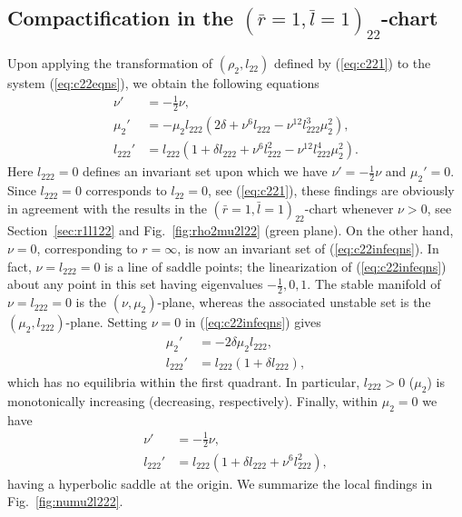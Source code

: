 \documentclass[reqno,12pt]{amsart}
\newcommand{\secref}[1]{Section~\ref{sec:#1}}
\newcommand{\seclab}[1]{\label{sec:#1}}
\newcommand{\eqlab}[1]{\label{eq:#1}}
\renewcommand{\eqref}[1]{(\ref{eq:#1})}
\newcommand{\figref}[1]{Fig.~\ref{fig:#1}}
\numberwithin{equation}{section}
\begin{document}
\subsection{Compactification in the $(\bar r=1,\bar l=1)_{22}$-chart}\seclab{inf2}
Upon applying the transformation of $(\rho_2,l_{22})$ defined by \eqref{c221} to the system \eqref{c22eqns}, we obtain the following equations
\begin{equation}\eqlab{c22infeqns}
\begin{aligned}
  \nu' &= - \frac12 \nu,\\
  \mu_{2}' &= -\mu_2 l_{222}\left(2\delta+\nu^6 l_{222}-\nu^{12} l_{222}^3 \mu_2^2\right),\\
 l_{222}' &=l_{222}\left(1+\delta l_{222}+\nu^6 l_{222}^2-\nu^{12} l_{222}^4 \mu_2^2\right).
\end{aligned}
\end{equation}
Here $l_{222}=0$ defines an invariant set upon which we have $\nu' = -\frac12 \nu$ and $\mu_2'=0$. Since $l_{222}=0$ corresponds to $l_{22}=0$, see \eqref{c221}, these findings are obviously in agreement with the results in the $(\bar r=1,\bar l=1)_{22}$-chart whenever $\nu>0$, see \secref{r1l122} and \figref{rho2mu2l22} (green plane). On the other hand, $\nu=0$, corresponding to $r=\infty$, is now an invariant set of \eqref{c22infeqns}. In fact, $\nu=l_{222}=0$ is a line of saddle points; the linearization of \eqref{c22infeqns} about any point in this set having eigenvalues $-\frac12,0,1$. The stable manifold of $\nu=l_{222}=0$ is the $(\nu,\mu_2)$-plane, whereas the associated unstable set is the $(\mu_2,l_{222})$-plane. Setting $\nu=0$ in \eqref{c22infeqns} gives
\begin{align*}
  \mu_{2}' &= -2\delta \mu_2 l_{222},\\
  l_{222}' &=l_{222}\left(1+\delta l_{222}\right),
\end{align*}
which has no equilibria within the first quadrant. In particular, $l_{222}>0$ ($\mu_2$) is monotonically increasing (decreasing, respectively). 
% 
Finally, within $\mu_2=0$ we have 
\begin{align*}
 \nu' &= - \frac12 \nu,\\
  l_{222}' &=l_{222}\left(1+\delta l_{222}+\nu^6 l_{222}^2\right),
 \end{align*}
 having a hyperbolic saddle at the origin. We summarize the local findings in \figref{numu2l222}.
 
\end{document}

